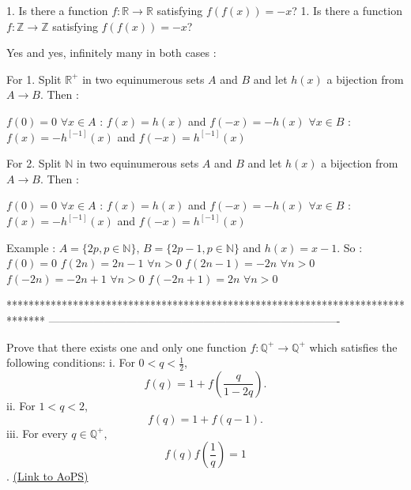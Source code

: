\begin{solution}
	\begin{tcolorbox}1. Is there a function $ f: \mathbb{R}\to \mathbb{R}$ satisfying $ f(f(x)) = - x$?
1. Is there a function $ f: \mathbb{Z}\to \mathbb{Z}$ satisfying $ f(f(x)) = - x$?\end{tcolorbox}

Yes and yes, infinitely many in both cases :

For 1. 
Split $ \mathbb R^ +$ in two equinumerous sets $ A$ and $ B$ and let $ h(x)$ a bijection from $ A\to B$. Then :

$ f(0) = 0$
$ \forall x\in A$ : $ f(x) = h(x)$ and $ f( - x) = - h(x)$
$ \forall x\in B$ : $ f(x) = - h^{[ - 1]}(x)$ and $ f( - x) = h^{[ - 1]}(x)$



For 2.
Split $ \mathbb N$ in two equinumerous sets $ A$ and $ B$ and let $ h(x)$ a bijection from $ A\to B$. Then :

$ f(0) = 0$
$ \forall x\in A$ : $ f(x) = h(x)$ and $ f( - x) = - h(x)$
$ \forall x\in B$ : $ f(x) = - h^{[ - 1]}(x)$ and $ f( - x) = h^{[ - 1]}(x)$

Example : $ A = \{2p,p\in\mathbb N\}$, $ B = \{2p - 1,p\in\mathbb N\}$ and $ h(x) = x - 1$. So :
$ f(0) = 0$
$ f(2n) = 2n - 1$ $ \forall n > 0$
$ f(2n - 1) = - 2n$ $ \forall n > 0$
$ f( - 2n) = - 2n + 1$ $ \forall n > 0$
$ f( - 2n + 1) = 2n$ $ \forall n > 0$
\end{solution}
*******************************************************************************
-------------------------------------------------------------------------------

\begin{problem}
	Prove that there exists one and only one function $ f: \mathbb{Q}^ + \to \mathbb{Q}^ +$ which satisfies the following conditions:
i. For $ 0 < q < \frac {1}{2}$, \[ f(q) = 1 + f(\frac {q}{1 - 2q}).\]
ii. For $ 1 < q < 2$, \[ f(q) = 1 + f(q - 1).\]
iii. For every $ q\in\mathbb{Q}^ +$, 
\[ f(q)f\left(\frac {1}{q}\right) = 1\].
	\flushright \href{https://artofproblemsolving.com/community/c6h307262}{(Link to AoPS)}
\end{problem}



